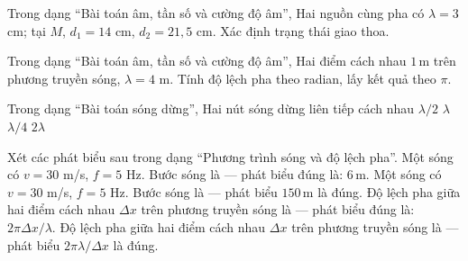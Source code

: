 \begin{ex}
Trong dạng “Bài toán âm, tần số và cường độ âm”, Hai nguồn cùng pha có $\lambda=3$ cm; tại $M$, $d_1=14$ cm, $d_2=21,5$ cm. Xác định trạng thái giao thoa.
\choiceTF

\end{ex}

\begin{ex}
Trong dạng “Bài toán âm, tần số và cường độ âm”, Hai điểm cách nhau $1\,\text{m}$ trên phương truyền sóng, $\lambda=4$ m. Tính độ lệch pha theo radian, lấy kết quả theo $\pi$.
\end{ex}

\begin{ex}
Trong dạng “Bài toán sóng dừng”, Hai nút sóng dừng liên tiếp cách nhau
\choice
{\True $\lambda/2$}
{$\lambda$}
{$\lambda/4$}
{$2\lambda$}
\end{ex}

\begin{ex}
Xét các phát biểu sau trong dạng “Phương trình sóng và độ lệch pha”.
\choiceTF
{\True Một sóng có $v=30$ m/s, $f=5$ Hz. Bước sóng là — phát biểu đúng là: $6\,\text{m}$.}
{Một sóng có $v=30$ m/s, $f=5$ Hz. Bước sóng là — phát biểu $150\,\text{m}$ là đúng.}
{\True Độ lệch pha giữa hai điểm cách nhau $\Delta x$ trên phương truyền sóng là — phát biểu đúng là: $2\pi\Delta x/\lambda$.}
{Độ lệch pha giữa hai điểm cách nhau $\Delta x$ trên phương truyền sóng là — phát biểu $2\pi\lambda/\Delta x$ là đúng.}
\end{ex}


